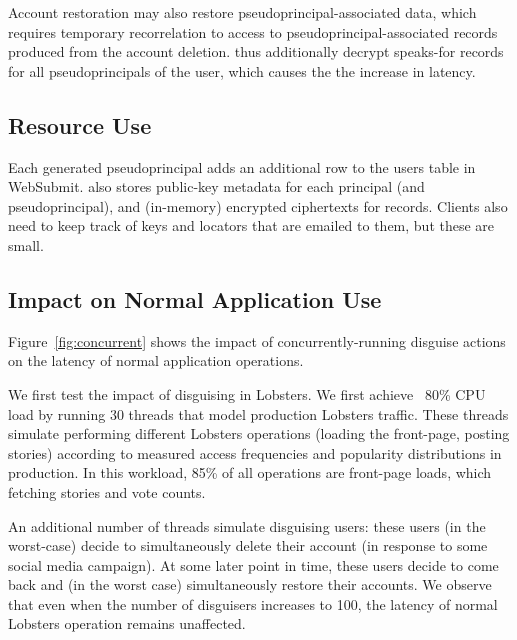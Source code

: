 Account restoration may also restore pseudoprincipal-associated data, which requires temporary
recorrelation to access to pseudoprincipal-associated records produced from the account deletion.
\sys thus additionally decrypt speaks-for records for all pseudoprincipals of the user, which causes
the the increase in latency.

\subsection{Resource Use}
\label{s:eval-res}


%
Each generated pseudoprincipal adds an additional row to the users table in WebSubmit.
%
\sys also stores public-key metadata for each principal (and pseudoprincipal), and
(in-memory) encrypted ciphertexts for records.
%
Clients also need to keep track of keys and locators that are emailed to them, but these
are small.
%

\subsection{Impact on Normal Application Use}
\label{s:eval-conc}

Figure~\ref{fig:concurrent} shows the impact of concurrently-running disguise actions on the latency
of normal application operations.

We first test the impact of disguising in Lobsters. We first achieve ~80\% CPU load by running
30 threads that model production Lobsters traffic. These threads simulate performing different
Lobsters operations (\eg loading the front-page, posting stories) according to measured access
frequencies and popularity distributions in production. In this workload, 85\% of all
operations are front-page loads, which fetching stories and vote counts.

An additional number of threads simulate disguising users: these users (in the worst-case) decide to
simultaneously delete their account (\eg in response to some social media campaign). At some later
point in time, these users decide to come back and (in the worst case) simultaneously restore their
accounts.
We observe that even when the number of disguisers increases to 100, the latency of normal Lobsters
operation remains unaffected.

